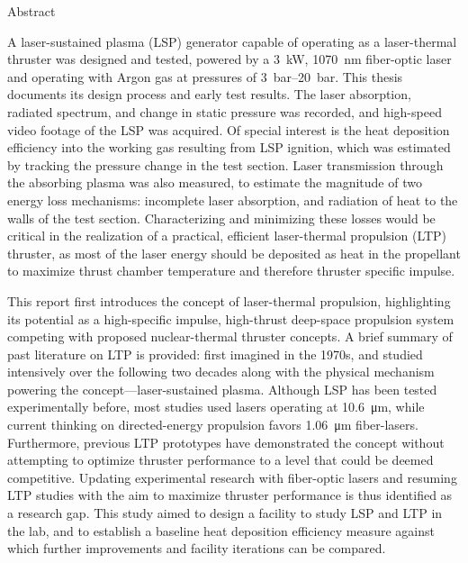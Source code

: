 \begin{plainchp}{Abstract}

    A laser-sustained plasma (LSP) generator capable of operating as a laser-thermal thruster was designed and tested, powered by a \qty{3}{kW}, \qty{1070}{nm} fiber-optic laser and operating with Argon gas at pressures of \qtyrange{3}{20}{bar}. This thesis documents its design process and early test results. The laser absorption, radiated spectrum, and change in static pressure was recorded, and high-speed video footage of the LSP was acquired. Of special interest is the heat deposition efficiency into the working gas resulting from LSP ignition, which was estimated by tracking the pressure change in the test section. Laser transmission through the absorbing plasma was also measured, to estimate the magnitude of two energy loss mechanisms: incomplete laser absorption, and radiation of heat to the walls of the test section. Characterizing and minimizing these losses would be critical in the realization of a practical, efficient laser-thermal propulsion (LTP) thruster, as most of the laser energy should be deposited as heat in the propellant to maximize thrust chamber temperature and therefore thruster specific impulse.

    This report first introduces the concept of laser-thermal propulsion, highlighting its potential as a high-specific impulse, high-thrust deep-space pro\-pulsion system competing with proposed nuclear-thermal thruster concepts. A brief summary of past literature on LTP is provided: first imagined in the 1970s, and studied intensively over the following two decades along with the physical mechanism powering the concept---laser-sustained plasma. Although LSP has been tested experimentally before, most studies used  lasers operating at \qty{10.6}{\um}, while current thinking on directed-energy pro\-pulsion favors \qty{1.06}{\um} fiber-lasers. Furthermore, previous LTP prototypes have demonstrated the concept without attempting to optimize thruster performance to a level that could be deemed competitive. Updating experimental research with fiber-optic lasers and resuming LTP studies with the aim to maximize thruster performance is thus identified as a research gap. This study aimed to design a facility to study LSP and LTP in the lab, and to establish a baseline heat deposition efficiency measure against which further improvements and facility iterations can be compared.


\end{plainchp}
